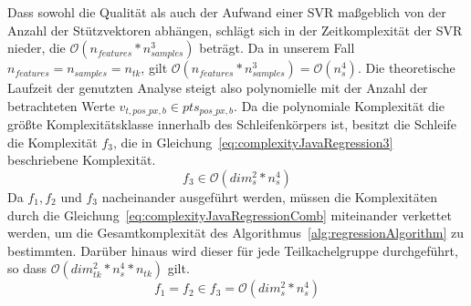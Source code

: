 Dass sowohl die Qualität als auch der Aufwand einer SVR maßgeblich von der Anzahl der Stützvektoren abhängen, schlägt sich in der Zeitkomplexität der SVR nieder, die $\mathcal{O}(n_{features} * n_{samples}^3)$ beträgt. Da in unserem Fall $n_{features} = n_{samples} = n_{tk}$, gilt $\mathcal{O}(n_{features} * n_{samples}^3) = \mathcal{O}(n_{s}^4)$. Die theoretische Laufzeit der genutzten Analyse steigt also polynomielle mit der Anzahl der betrachteten Werte  $v_{t, pos\_px, b} \in pts_{pos\_px, b}$. Da die polynomiale Komplexität die größte Komplexitätsklasse innerhalb des Schleifenkörpers ist, besitzt die Schleife die Komplexität $f_3$, die in Gleichung~\ref{eq:complexityJavaRegression3} beschriebene Komplexität.
%
\begin{equation} \label{eq:complexityJavaRegression3}
f_3 \in \mathcal{O}(dim_{s}^2 * n_{s}^4)
\end{equation}
%
Da $f_1, f_2$ und $f_3$ nacheinander ausgeführt werden, müssen die Komplexitäten durch die Gleichung~\ref{eq:complexityJavaRegressionComb} miteinander verkettet werden, um die Gesamtkomplexität des Algorithmus~\ref{alg:regressionAlgorithm} zu bestimmten. Darüber hinaus wird dieser für jede Teilkachelgruppe durchgeführt, so dass $\mathcal{O}(dim_{tk}^2 * n_{s}^4 * n_{tk})$ gilt.
%
\begin{equation} \label{eq:complexityJavaRegressionComb}
f_1 = f_2 \in f_3 = \mathcal{O}(dim_{s}^2 * n_{s}^4)
\end{equation}
%
